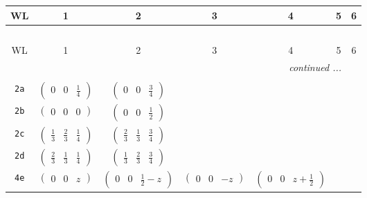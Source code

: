 \documentclass[fleqn,9pt,landscape]{jsarticle}
\begin{document}
\begin{center}
\renewcommand{\arraystretch}{1.2}
\begin{longtable}{ccccccc}
 \hline \hline
WL & 1 & 2 & 3 & 4 & 5 & 6 \\ \hline \endfirsthead

\multicolumn{6}{l}{\tablename\ \thetable{}} \\
 \hline \hline
WL & 1 & 2 & 3 & 4 & 5 & 6 \\ \hline \endhead

 \hline \hline
\multicolumn{6}{r}{\footnotesize\it continued ...} \\ \endfoot

 \hline \hline
\multicolumn{6}{r}{} \\ \endlastfoot

{\tt 2a} & $ \begin{pmatrix} 0 & 0 & \frac{1}{4} \end{pmatrix} $ & $ \begin{pmatrix} 0 & 0 & \frac{3}{4} \end{pmatrix} $ & $  $ & $  $ & $  $ & $  $ \\ \hline
{\tt 2b} & $ \begin{pmatrix} 0 & 0 & 0 \end{pmatrix} $ & $ \begin{pmatrix} 0 & 0 & \frac{1}{2} \end{pmatrix} $ & $  $ & $  $ & $  $ & $  $ \\ \hline
{\tt 2c} & $ \begin{pmatrix} \frac{1}{3} & \frac{2}{3} & \frac{1}{4} \end{pmatrix} $ & $ \begin{pmatrix} \frac{2}{3} & \frac{1}{3} & \frac{3}{4} \end{pmatrix} $ & $  $ & $  $ & $  $ & $  $ \\ \hline
{\tt 2d} & $ \begin{pmatrix} \frac{2}{3} & \frac{1}{3} & \frac{1}{4} \end{pmatrix} $ & $ \begin{pmatrix} \frac{1}{3} & \frac{2}{3} & \frac{3}{4} \end{pmatrix} $ & $  $ & $  $ & $  $ & $  $ \\ \hline
{\tt 4e} & $ \begin{pmatrix} 0 & 0 & z \end{pmatrix} $ & $ \begin{pmatrix} 0 & 0 & \frac{1}{2} - z \end{pmatrix} $ & $ \begin{pmatrix} 0 & 0 & - z \end{pmatrix} $ & $ \begin{pmatrix} 0 & 0 & z + \frac{1}{2} \end{pmatrix} $ & $  $ & $  $ \\ \hline

\end{longtable}
\end{center}
\end{document}
